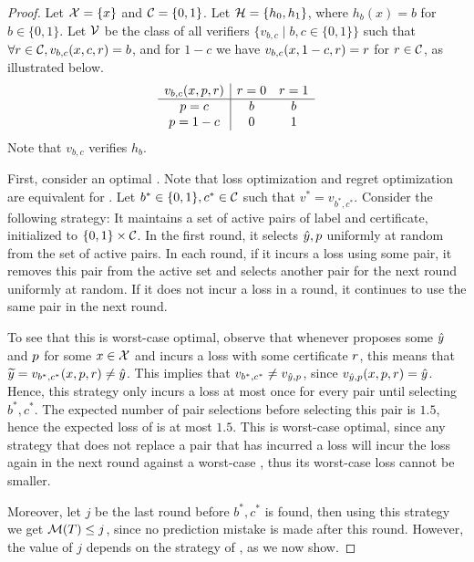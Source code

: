 \documentclass[11pt,letterpaper]{article}
\theoremstyle{definition}
\theoremstyle{plain}
\begin{document}
\begin{proof}
Let ${\mathcal X} = \{x\}$ and ${{\mathcal C}} = \{0,1\}$. Let ${{\mathcal H}} = \{h_0,h_1\}$, where $h_b(x) = b$ for  $b\in\{0,1\}$. Let ${\mathcal V}$ be the class of all verifiers $\{ v_{b,c} \mid b,c \in \{0,1\}\}$  such that $\forall {r} \in {{\mathcal C}}, v_{b,c}(x,c,{r}) = b$, and for $1-c$ we have $v_{b,c}(x,1-c,{r}) = {r}$ for ${r} \in {{\mathcal C}}$, as illustrated below.
\[
\begin{array}{c|cc}
 v_{b,c}(x,{p},{r}) & {r}=0 & {r}=1\\
\hline
{p}=c & b & b\\
{p} = 1-c & 0 & 1
\end{array}
\]
Note that $v_{b,c}$ verifies $h_b$. 

First, consider an optimal \dt. Note that loss optimization and regret optimization are equivalent for \dt. Let $b^* \in \{0,1\},c^*\in {{\mathcal C}}$ such that $v^* = v_{b^*,c^*}$. Consider the following \dt strategy: It maintains a set of active pairs of label and certificate, initialized to $\{0,1\}\times {{\mathcal C}}$. In the first round, it selects ${\hat{y}},{p}$ uniformly at random from the set of active pairs. In each round, if it incurs a loss using some pair, it removes this pair from the active set and selects another pair for the next round uniformly at random. If it does not incur a loss in a round, it continues to use the same pair in the next round. 

To see that this is worst-case optimal, observe that whenever \dt proposes some ${\hat{y}}$ and ${p}$ for some $x \in {\mathcal X}$ and incurs a loss with some \df certificate ${r}$, this means that 
${\widetilde{y}} = v_{b^*,c^*}(x,{p},{r}) \neq {\hat{y}}$. This implies that $v_{b^*, c^*} \neq v_{{\hat{y}},{p}}$, since $v_{{\hat{y}},{p}}(x,{p},{r}) = {\hat{y}}$. Hence, this \dt strategy only incurs a loss at most once for every pair until selecting $b^*, c^*$. The expected number of pair selections before selecting this pair is $1.5$, hence the expected loss of \dt is at most $1.5$. This is worst-case optimal, since any strategy that does not replace a pair that has incurred a loss will incur the loss again in the next round against a worst-case \df, thus its worst-case loss cannot be smaller.

Moreover, let $j$ be the last round before $b^*,c^*$ is found, then using this \dt strategy we get ${\mathcal M}(T) \leq j$, since no prediction mistake is made after this round. However, the value of $j$ depends on the strategy of \df, as we now show.


\end{proof}
\end{document}
